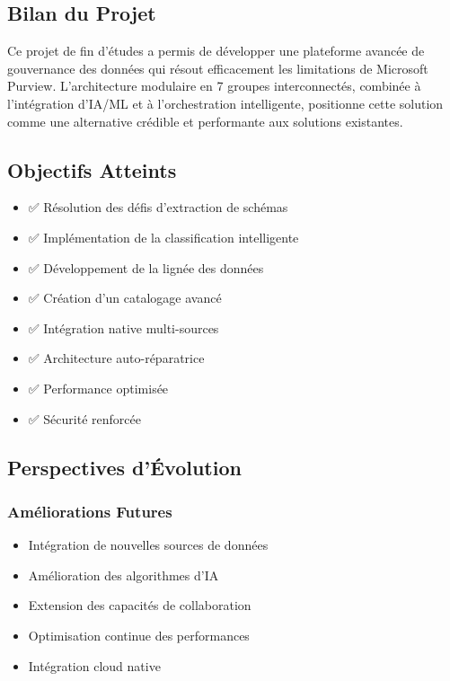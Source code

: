 \documentclass[12pt,a4paper]{article}
\begin{document}
\subsection{Bilan du Projet}

Ce projet de fin d'études a permis de développer une plateforme avancée de gouvernance des données qui résout efficacement les limitations de Microsoft Purview. L'architecture modulaire en 7 groupes interconnectés, combinée à l'intégration d'IA/ML et à l'orchestration intelligente, positionne cette solution comme une alternative crédible et performante aux solutions existantes.

\subsection{Objectifs Atteints}

\begin{itemize}
    \item ✅ Résolution des défis d'extraction de schémas
    \item ✅ Implémentation de la classification intelligente
    \item ✅ Développement de la lignée des données
    \item ✅ Création d'un catalogage avancé
    \item ✅ Intégration native multi-sources
    \item ✅ Architecture auto-réparatrice
    \item ✅ Performance optimisée
    \item ✅ Sécurité renforcée
\end{itemize}

\subsection{Perspectives d'Évolution}

\subsubsection{Améliorations Futures}
\begin{itemize}
    \item Intégration de nouvelles sources de données
    \item Amélioration des algorithmes d'IA
    \item Extension des capacités de collaboration
    \item Optimisation continue des performances
    \item Intégration cloud native
\end{itemize}
\end{document}

